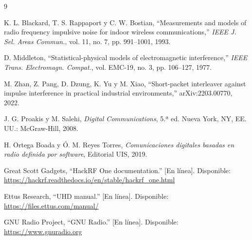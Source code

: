 \begin{thebibliography}{9}

 K. L. Blackard, T. S. Rappaport y C. W. Bostian, ``Measurements and models of radio frequency impulsive noise for indoor wireless communications,'' \emph{IEEE J. Sel. Areas Commun.}, vol. 11, no. 7, pp. 991--1001, 1993.

 D. Middleton, ``Statistical-physical models of electromagnetic interference,'' \emph{IEEE Trans. Electromagn. Compat.}, vol. EMC-19, no. 3, pp. 106--127, 1977.

 M. Zhan, Z. Pang, D. Dzung, K. Yu y M. Xiao, ``Short-packet interleaver against impulse interference in practical industrial environments,'' arXiv:2203.00770, 2022.

 J. G. Proakis y M. Salehi, \emph{Digital Communications}, 5.ª ed. Nueva York, NY, EE.\,UU.: McGraw-Hill, 2008.

 H. Ortega Boada y Ó. M. Reyes Torres, \emph{Comunicaciones digitales basadas en radio definida por software}, Editorial UIS, 2019.

 Great Scott Gadgets, ``HackRF One documentation.'' [En línea]. Disponible: \url{https://hackrf.readthedocs.io/en/stable/hackrf_one.html}

 Ettus Research, ``UHD manual.'' [En línea]. Disponible: \url{https://files.ettus.com/manual/}

 GNU Radio Project, ``GNU Radio.'' [En línea]. Disponible: \url{https://www.gnuradio.org}

\end{thebibliography}
